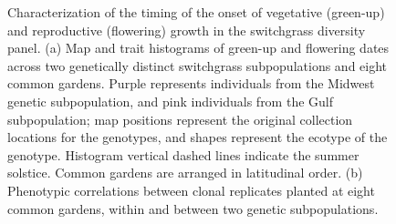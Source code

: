 \documentclass[
  9pt,
  twocolumn,
  twoside]{simple-article}%
\begin{document}
\begin{figure}


\caption{\label{fig-map}Characterization of the timing of the onset of
vegetative (green-up) and reproductive (flowering) growth in the
switchgrass diversity panel. (a) Map and trait histograms of green-up
and flowering dates across two genetically distinct switchgrass
subpopulations and eight common gardens. Purple represents individuals
from the Midwest genetic subpopulation, and pink individuals from the
Gulf subpopulation; map positions represent the original collection
locations for the genotypes, and shapes represent the ecotype of the
genotype. Histogram vertical dashed lines indicate the summer solstice.
Common gardens are arranged in latitudinal order. (b) Phenotypic
correlations between clonal replicates planted at eight common gardens,
within and between two genetic subpopulations.}

\end{figure}%
\end{document}
